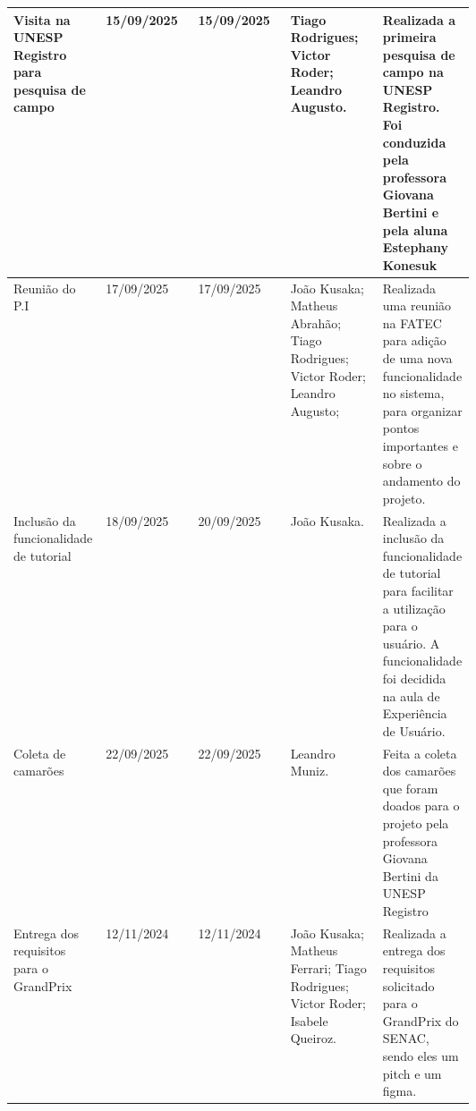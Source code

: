 \documentclass[
landscape,
  a4paper,
  12pt,
  english,
  brazilian,
]{article}
\begin{document}
 \begin{table}[]
\centering


\begin{tabular}{|>{\raggedright\arraybackslash}p{0.2\linewidth}|l|l|>{\raggedright\arraybackslash}p{0.2\linewidth}|>{\raggedright\arraybackslash}p{0.2\linewidth}|}

\hline

Visita na UNESP Registro para pesquisa de campo& 15/09/2025& 15/09/2025&  Tiago Rodrigues; Victor Roder; Leandro Augusto. &Realizada a primeira pesquisa de campo na UNESP Registro. Foi conduzida pela professora Giovana Bertini e pela aluna Estephany Konesuk\\\hline
 Reunião do P.I& 17/09/2025& 17/09/2025& João Kusaka; Matheus Abrahão; Tiago Rodrigues; Victor Roder; Leandro Augusto;& Realizada uma reunião na FATEC para adição de uma nova funcionalidade no sistema, para organizar pontos importantes e sobre o andamento do projeto.\\\hline
 Inclusão da funcionalidade de tutorial& 18/09/2025& 20/09/2025& João Kusaka.&Realizada a inclusão da funcionalidade de tutorial para facilitar a utilização para o usuário. A funcionalidade foi decidida na aula de Experiência de Usuário.\\ \hline 
 Coleta de camarões& 22/09/2025& 22/09/2025& Leandro Muniz. &Feita a coleta dos camarões que foram doados para o projeto pela professora Giovana Bertini da UNESP Registro\\\hline
                  Entrega dos requisitos para o GrandPrix&                            12/11/2024&                12/11/2024&                 João Kusaka; Matheus Ferrari; Tiago Rodrigues; Victor Roder; Isabele Queiroz.&                                  Realizada a entrega dos requisitos solicitado para o GrandPrix do SENAC, sendo eles um pitch e um figma.\\ \hline 

\end{tabular}


\end{table}
\end{document}
